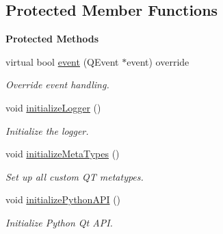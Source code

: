 \subsection*{Protected Member Functions}
\begin{Indent}\textbf{ Protected Methods}\par
\begin{DoxyCompactItemize}
\item 
\mbox{\label{classrev_1_1_core_engine_a9b507ebc22c20b685f806b8cb345ac1f}} 
virtual bool \mbox{\hyperlink{classrev_1_1_core_engine_a9b507ebc22c20b685f806b8cb345ac1f}{event}} (Q\+Event $\ast$event) override
\begin{DoxyCompactList}\small\item\em Override event handling. \end{DoxyCompactList}\item 
\mbox{\label{classrev_1_1_core_engine_a3d552b6194f02240e3519f5699391be0}} 
void \mbox{\hyperlink{classrev_1_1_core_engine_a3d552b6194f02240e3519f5699391be0}{initialize\+Logger}} ()
\begin{DoxyCompactList}\small\item\em Initialize the logger. \end{DoxyCompactList}\item 
\mbox{\label{classrev_1_1_core_engine_aca545830149611716795eb43bd8b90a0}} 
void \mbox{\hyperlink{classrev_1_1_core_engine_aca545830149611716795eb43bd8b90a0}{initialize\+Meta\+Types}} ()
\begin{DoxyCompactList}\small\item\em Set up all custom QT metatypes. \end{DoxyCompactList}\item 
\mbox{\label{classrev_1_1_core_engine_a2b4d89b36fdeb975a860e4b6be5c6203}} 
void \mbox{\hyperlink{classrev_1_1_core_engine_a2b4d89b36fdeb975a860e4b6be5c6203}{initialize\+Python\+A\+PI}} ()
\begin{DoxyCompactList}\small\item\em Initialize Python Qt A\+PI. \end{DoxyCompactList}\end{DoxyCompactItemize}
\end{Indent}
